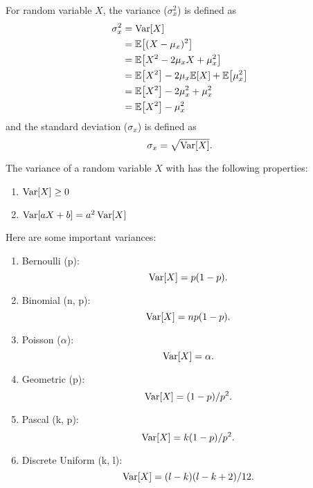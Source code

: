 \begin{definition}
    For random variable $X$, the variance ($\sigma_x^2$) is defined as
    \begin{align*}
        \sigma_x^2
        &= \Var[X] \\
        &= \E{(X-\mu_x)^2} \\
        &= \E{X^2-2\mu_x X+\mu_x^2} \\
        &= \E{X^2}-2\mu_x\E{X}+\E{\mu_x^2} \\
        &= \E{X^2}-2\mu_x^2+\mu_x^2 \\
        &= \E{X^2}-\mu_x^2
    \end{align*}
    and the standard deviation ($\sigma_x$) is defined as
    \begin{equation*}
        \sigma_x = \sqrt{\mathop{\mathrm{Var}}\nolimits[X]}.
    \end{equation*}
\end{definition}

\begin{theorem}
    The variance of a random variable $X$ with has the following properties:
    \begin{enumerate}
        \item $\mathop{\mathrm{Var}}\nolimits[X]\geq 0$
        \item $\mathop{\mathrm{Var}}\nolimits[aX+b]=a^2\mathop{\mathrm{Var}}\nolimits[X]$
    \end{enumerate}
\end{theorem}

\begin{theorem}
    Here are some important variances:
    \begin{enumerate}
        \item Bernoulli (p): \[\mathop{\mathrm{Var}}\nolimits[X]=p(1-p).\]
        \item Binomial (n, p): \[\mathop{\mathrm{Var}}\nolimits[X]=np(1-p).\]
        \item Poisson ($\alpha$): \[\mathop{\mathrm{Var}}\nolimits[X]=\alpha.\]
        \item Geometric (p): \[\mathop{\mathrm{Var}}\nolimits[X]=(1-p)/p^2.\]
        \item Pascal (k, p): \[\mathop{\mathrm{Var}}\nolimits[X]=k(1-p)/p^2.\]
        \item Discrete Uniform (k, l): \[\mathop{\mathrm{Var}}\nolimits[X]=(l-k)(l-k+2)/12.\]
    \end{enumerate}
\end{theorem}